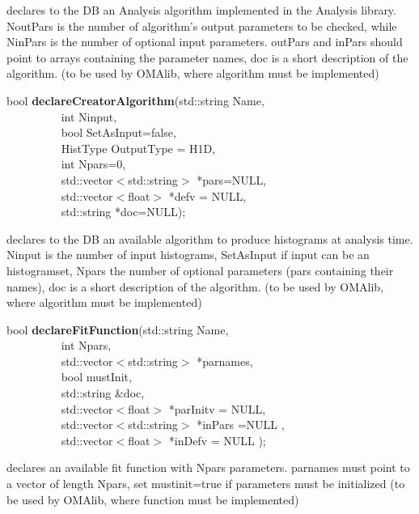  declares to the DB an Analysis algorithm implemented in the Analysis
 library. NoutPars is the number of algorithm's output parameters to be checked, 
 while NinPars is the number of optional input parameters.
 outPars and inPars should point to arrays containing the parameter names, 
 doc is a short description of the algorithm.
 (to be used by OMAlib, where algorithm must be implemented)


\item    bool {\bf declareCreatorAlgorithm}(std::string Name,\\\mbox{}~~~~~~~~~ 
			       int Ninput,\\\mbox{}~~~~~~~~~
			       bool SetAsInput=false,\\\mbox{}~~~~~~~~~
			       HistType OutputType = H1D,\\\mbox{}~~~~~~~~~
			       int Npars=0,\\\mbox{}~~~~~~~~~ 
			       std::vector$<$std::string$>$ *pars=NULL,\\\mbox{}~~~~~~~~~
			       std::vector$<$float$>$ *defv = NULL,\\\mbox{}~~~~~~~~~
			       std::string *doc=NULL);

 declares to the DB an available algorithm to produce histograms at
 analysis time. Ninput is the number of input histograms, SetAsInput
 if input can be an histogramset, Npars the
 number of optional parameters (pars containing their names), doc is a short
 description of the algorithm.
 (to be used by OMAlib, where algorithm must be implemented)


\item    bool {\bf declareFitFunction}(std::string Name,\\\mbox{}~~~~~~~~~ 
                          int Npars,\\\mbox{}~~~~~~~~~
                          std::vector$<$std::string$>$ *parnames,\\\mbox{}~~~~~~~~~
                          bool mustInit,\\\mbox{}~~~~~~~~~
                          std::string \&doc,\\\mbox{}~~~~~~~~~
                          std::vector$<$float$>$ *parInitv = NULL,\\\mbox{}~~~~~~~~~
                          std::vector$<$std::string$>$ *inPars =NULL ,\\\mbox{}~~~~~~~~~
                          std::vector$<$float$>$ *inDefv = NULL );

 declares an available fit function with Npars parameters. parnames must point to a vector
 of length Npars, set mustinit=true if parameters must be initialized
 (to be used by OMAlib, where function must be implemented)


